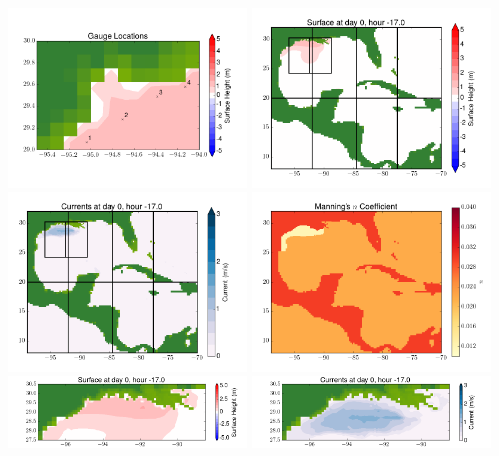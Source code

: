 \documentclass[11pt]{article}
\begin{document}
\includegraphics[width=0.475\textwidth]{frame0054fig10.png}
\vskip 10pt 
\includegraphics[width=0.475\textwidth]{frame0055fig1.png}
\includegraphics[width=0.475\textwidth]{frame0055fig2.png}
\vskip 10pt 
\includegraphics[width=0.475\textwidth]{frame0055fig3.png}
\includegraphics[width=0.475\textwidth]{frame0055fig4.png}
\vskip 10pt 
\includegraphics[width=0.475\textwidth]{frame0055fig5.png}
\end{document}
